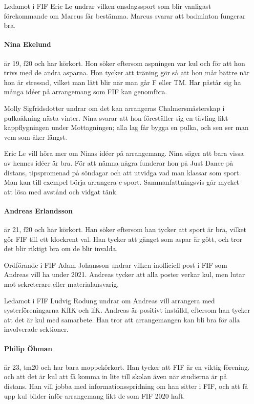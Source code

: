 \documentclass[hidelinks]{sektionsmote}
\begin{document}
Ledamot i FIF Eric Le undrar vilken onsdagssport som blir vanligast förekommande om Marcus får bestämma.
Marcus svarar att badminton fungerar bra.

\paragraph{Nina Ekelund} är 19, f20 och har körkort.
Hon söker eftersom aspningen var kul och för att hon trivs med de andra asparna.
Hon tycker att träning gör så att hon mår bättre när hon är stressad, vilket man lätt blir när man går F eller TM.
Har påstår sig ha många idéer på arrangemang som FIF kan genomföra.

Molly Sigfridsdotter undrar om det kan arrangeras Chalmersmästerskap i pulkaåkning nästa vinter.
Nina svarar att hon föreställer sig en tävling likt kappflygningen under Mottagningen; alla lag får bygga en pulka, och sen ser man vem som åker längst.

Eric Le vill höra mer om Ninas idéer på arrangemang.
Nina säger att bara vissa av hennes idéer är bra.
För att nämna några funderar hon på Just Dance på distans, tipspromenad på söndagar och att utvidga vad man klassar som sport.
Man kan till exempel börja arrangera e-sport.
Sammanfattningsvis går mycket att lösa med avstånd och vidgat tänk.

\paragraph{Andreas Erlandsson} är 21, f20 och har körkort.
Han söker eftersom han tycker att sport är bra, vilket gör FIF till ett klockrent val.
Han tycker att gänget som aspar är gött, och tror det blir riktigt bra om de blir invalda.

Ordförande i FIF Adam Johansson undrar vilken inofficiell post i FIF som Andreas vill ha under 2021.
Andreas tycker att alla poster verkar kul, men lutar mot sekreterare eller materialansvarig.

Ledamot i FIF Ludvig Rodung undrar om Andreas vill arrangera med systerföreningarna KfIK och ifK.
Andreas är positivt inställd, eftersom han tycker att det är kul med samarbete.
Han tror att arrangemangen kan bli bra för alla involverade sektioner.

\paragraph{Philip Öhman} är 23, tm20 och har bara moppekörkort.
Han tycker att FIF är en viktig förening, och att det är kul att få komma in lite till skolan även när studierna är på distans.
Han vill jobba med informationsspridning om han sitter i FIF, och att få upp kul bilder inför arrangemang likt de som FIF 2020 haft.
\end{document}
